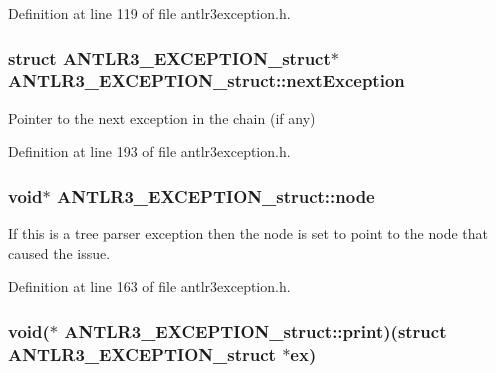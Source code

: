 Definition at line 119 of file antlr3exception.\-h.

\hypertarget{struct_a_n_t_l_r3___e_x_c_e_p_t_i_o_n__struct_aa10dbef2cfd1b56448e18587e48bbccb}{
\subsubsection[{next\-Exception}]{\setlength{\rightskip}{0pt plus 5cm}struct {\bf A\-N\-T\-L\-R3\-\_\-\-E\-X\-C\-E\-P\-T\-I\-O\-N\-\_\-struct}$\ast$ A\-N\-T\-L\-R3\-\_\-\-E\-X\-C\-E\-P\-T\-I\-O\-N\-\_\-struct\-::next\-Exception}}\label{struct_a_n_t_l_r3___e_x_c_e_p_t_i_o_n__struct_aa10dbef2cfd1b56448e18587e48bbccb}
Pointer to the next exception in the chain (if any) 

Definition at line 193 of file antlr3exception.\-h.

\hypertarget{struct_a_n_t_l_r3___e_x_c_e_p_t_i_o_n__struct_aea8c0c80b707236ac671997abefaee34}{
\subsubsection[{node}]{\setlength{\rightskip}{0pt plus 5cm}void$\ast$ A\-N\-T\-L\-R3\-\_\-\-E\-X\-C\-E\-P\-T\-I\-O\-N\-\_\-struct\-::node}}\label{struct_a_n_t_l_r3___e_x_c_e_p_t_i_o_n__struct_aea8c0c80b707236ac671997abefaee34}
If this is a tree parser exception then the node is set to point to the node that caused the issue. 

Definition at line 163 of file antlr3exception.\-h.

\hypertarget{struct_a_n_t_l_r3___e_x_c_e_p_t_i_o_n__struct_a1b5513423bdabac1b5bfd00aa74b7cd0}{
\subsubsection[{print}]{\setlength{\rightskip}{0pt plus 5cm}void($\ast$ A\-N\-T\-L\-R3\-\_\-\-E\-X\-C\-E\-P\-T\-I\-O\-N\-\_\-struct\-::print)(struct {\bf A\-N\-T\-L\-R3\-\_\-\-E\-X\-C\-E\-P\-T\-I\-O\-N\-\_\-struct} $\ast$ex)}}\label{struct_a_n_t_l_r3___e_x_c_e_p_t_i_o_n__struct_a1b5513423bdabac1b5bfd00aa74b7cd0}


